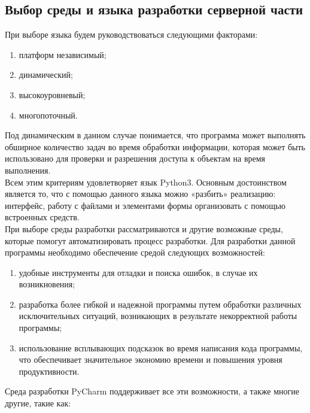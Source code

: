 \documentclass[a4paper, 10pt]{article}
\begin{document}
	\subsection{Выбор среды и языка разработки серверной части}
	При выборе языка будем руководствоваться следующими факторами:
	\begin{enumerate}
		\item платформ независимый;
		\item динамический;
		\item высокоуровневый;
		\item многопоточный.
	\end{enumerate}
	\hspace*{5mm} Под динамическим в данном случае понимается, что программа может выполнять обширное количество задач во время обработки информации, которая может быть использовано для проверки и разрешения доступа к объектам на время выполнения. 
	\\ \hspace*{5mm} Всем этим критериям удовлетворяет язык Python3. Основным достоинством является то, что с помощью данного языка можно «разбить» реализацию: интерфейс, работу с файлами и элементами формы организовать с помощью встроенных средств. 
	\\ \hspace*{5mm} При выборе среды разработки рассматриваются и другие возможные среды, которые помогут автоматизировать процесс разработки. Для разработки данной программы необходимо обеспечение средой следующих возможностей: 
	\begin{enumerate}
		\item удобные инструменты для отладки и поиска ошибок, в случае их возникновения;
		\item разработка более гибкой и надежной программы путем обработки различных исключительных ситуаций, возникающих в результате некорректной работы программы;
		\item использование всплывающих подсказок во время написания кода программы, что обеспечивает значительное экономию времени и повышения уровня продуктивности.
	\end{enumerate}
	\hspace*{5mm} Среда разработки PyCharm\cite{pycharm} поддерживает все эти возможности, а также многие другие, такие как: 
\end{document}
